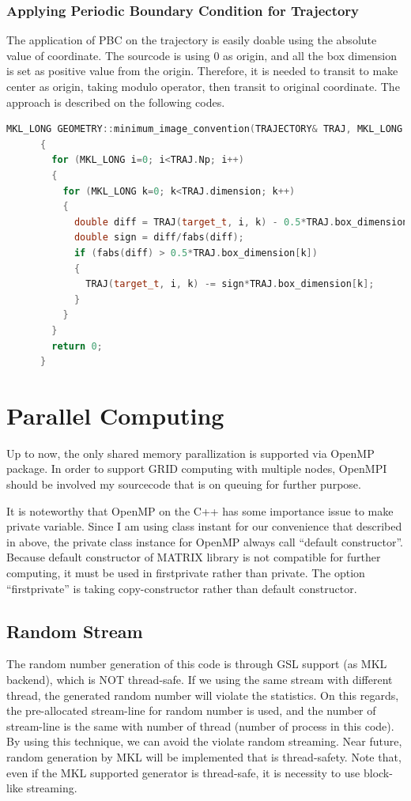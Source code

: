 \documentclass[10pt, a4paper]{article}
\begin{document}
\begin{appendices}
  \subsection{Applying Periodic Boundary Condition for Trajectory}
    The application of PBC on the trajectory is easily doable using the absolute value of coordinate. The sourcode is using 0 as origin, and all the box dimension is set as positive value from the origin. Therefore, it is needed to transit to make center as origin, taking modulo operator, then transit to original coordinate. The approach is described on the following codes.
    \begin{lstlisting}[language=C++, frame=single]
      MKL_LONG GEOMETRY::minimum_image_convention(TRAJECTORY& TRAJ, MKL_LONG target_t)
      {
        for (MKL_LONG i=0; i<TRAJ.Np; i++)
        {
          for (MKL_LONG k=0; k<TRAJ.dimension; k++)
          {
            double diff = TRAJ(target_t, i, k) - 0.5*TRAJ.box_dimension[k];
            double sign = diff/fabs(diff);
            if (fabs(diff) > 0.5*TRAJ.box_dimension[k])
            {
              TRAJ(target_t, i, k) -= sign*TRAJ.box_dimension[k];
            }
          }
        }
        return 0;
      }
    \end{lstlisting}
  
  \chapter{Parallel Computing}
  Up to now, the only shared memory parallization is supported via OpenMP package. In order to support GRID computing with multiple nodes, OpenMPI should be involved my sourcecode that is on queuing for further purpose. 

  It is noteworthy that OpenMP on the C++ has some importance issue to make private variable. Since I am using class instant for our convenience that described in above, the private class instance for OpenMP always call ``default constructor''. Because default constructor of MATRIX library is not compatible for further computing, it must be used in firstprivate rather than private. The option ``firstprivate'' is taking copy-constructor rather than default constructor.

  \section{Random Stream}
  The random number generation of this code is through GSL support (as MKL backend), which is NOT thread-safe. If we using the same stream with different thread, the generated random number will violate the statistics. On this regards, the pre-allocated stream-line for random number is used, and the number of stream-line is the same with number of thread (number of process in this code). By using this technique, we can avoid the violate random streaming. Near future, random generation by MKL will be implemented that is thread-safety. Note that, even if the MKL supported generator is thread-safe, it is necessity to use block-like streaming.
  

\end{appendices}
\end{document}
